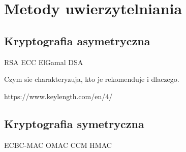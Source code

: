 \chapter{Metody uwierzytelniania}
\section{Kryptografia asymetryczna}

RSA
ECC
ElGamal
DSA

Czym sie charakteryzuja, kto je rekomenduje i dlaczego.

https://www.keylength.com/en/4/
\section{Kryptografia symetryczna}

ECBC-MAC
OMAC
CCM
HMAC
